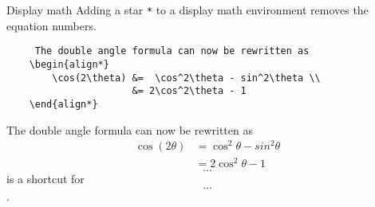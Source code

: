 \copyrightJesse

\begin{frame}[fragile]{Display math}
    Adding a star \texttt{*} to a display math environment removes the equation numbers.

    \begin{verbatim}
     The double angle formula can now be rewritten as   
    \begin{align*}
        \cos(2\theta) &=  \cos^2\theta - sin^2\theta \\
                      &= 2\cos^2\theta - 1 
    \end{align*}
\end{verbatim}
The double angle formula can now be rewritten as
    \begin{align*}
        \cos(2\theta) &=  \cos^2\theta - sin^2\theta \\
                      &= 2\cos^2\theta - 1 
    \end{align*}
\texttt{\[...\]} is a shortcut for \texttt{\begin{equation*}...\end{equation*}}.
\end{frame}
